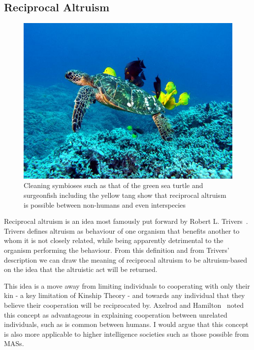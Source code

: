 \documentclass[]{final_report}
\begin{document}
\subsection{Reciprocal Altruism}
\begin{figure}
\vspace{-20pt}
\begin{framed}
	\center
	\includegraphics[width=\textwidth]{Green_Sea_Turtle_Cleaning_Station.jpg}
	\caption{Cleaning symbioses such as that of the green sea turtle and surgeonfish including the yellow tang show that reciprocal altruism is possible between non-humans and even interspecies~\cite{turtle}}
	\label{fig:cleaning}
\end{framed}
\vspace{-20pt}
\end{figure}
Reciprocal altruism is an idea most famously put forward by Robert L. Trivers~\cite{trivers1971evolution}. Trivers defines altruism as behaviour of one organism that benefits another to whom it is not closely related, while being apparently detrimental to the organism performing the behaviour. From this definition and from Trivers' description we can draw the meaning of reciprocal altruism to be altruism-based on the idea that the altruistic act will be returned.\par
This idea is a move away from limiting individuals to cooperating with only their kin - a key limitation of Kinship Theory - and towards any individual that they believe their cooperation will be reciprocated by. Axelrod and Hamilton~\cite{evolution_of_cooperation} noted this concept as advantageous in explaining cooperation between unrelated individuals, such as is common between humans. I would argue that this concept is also more applicable to higher intelligence societies such as those possible from MASs.
\end{document}
